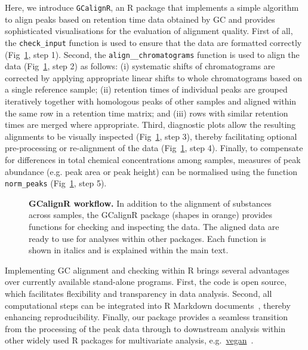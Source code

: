 \documentclass[10pt,letterpaper]{article}
\begin{document}
Here, we introduce \texttt{GCalignR}, an R package that implements a simple algorithm to align peaks based on retention time data obtained by GC and provides sophisticated visualisations for the evaluation of alignment quality. First of all, the \texttt{check\_input} function is used to ensure that the data are formatted correctly (Fig~\ref{Fig:Fig1}, step 1). Second, the \texttt{align\_\_chromatograms} function is used to align the data (Fig~\ref{Fig:Fig1}, step 2) as follows: (i) systematic shifts of chromatograms are corrected by applying appropriate linear shifts to whole chromatograms based on a single reference sample; (ii) retention times of individual peaks are grouped iteratively together with homologous peaks of other samples and aligned within the same row in a retention time matrix; and (iii) rows with similar retention times are merged where appropriate. Third, diagnostic plots allow the resulting alignments to be visually inspected (Fig~\ref{Fig:Fig1}, step 3), thereby facilitating optional pre-processing or re-alignment of the data (Fig~\ref{Fig:Fig1}, step 4). Finally, to compensate for differences in total chemical concentrations among samples, measures of peak abundance (e.g. peak area or peak height) can be normalised using the function \texttt{norm\_peaks} (Fig~\ref{Fig:Fig1}, step 5). \par

\begin{figure}[htbp]
\centering
\caption{\textbf{GCalignR workflow.}
In addition to the alignment of substances across samples, the GCalignR package (shapes in orange) provides functions for checking and inspecting the data. The aligned data are ready to use for analyses within other packages. Each function is shown in italics and is explained within the main text.}
\label{Fig:Fig1}
\end{figure}

Implementing GC alignment and checking within R brings several advantages over currently available stand-alone programs. First, the code is open source, which facilitates flexibility and transparency in data analysis. Second, all computational steps can be integrated into R Markdown documents~\cite{Allaire.2016}, thereby enhancing reproducibility. Finally, our package provides a seamless transition from the processing of the peak data through to downstream analysis within other widely used R packages for multivariate analysis, e.g.~\href{https://CRAN.R-project.org/package=vegan}{vegan}~\cite{Oksanen.2016}.
\end{document}
